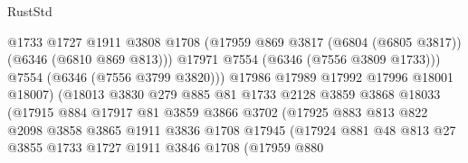\begin{lexlean}{RustStd}
\begin{coremodule}
                                    @1733
                                    @1727
                                    @1911
                                    @3808
                                    @1708
                                    (@17959
                                      @869
                                      @3817
                                      (@6804 (@6805 @3817))
                                      (@6346 (@6810 @869 @813)))
                                    @17971
                                    @7554
                                    (@6346 (@7556 @3809 @1733)))
                                  @7554
                                  (@6346 (@7556 @3799 @3820)))
                                @17986
                                @17989
                                @17992
                                @17996
                                @18001
                                @18007)
                              (@18013
                                @3830
                                @279
                                @885
                                @81
                                @1733
                                @2128
                                @3859
                                @3868
                                @18033
                                (@17915
                                  @884
                                  @17917
                                  @81
                                  @3859
                                  @3866
                                  @3702
                                  (@17925
                                    @883
                                    @813
                                    @822
                                    @2098
                                    @3858
                                    @3865
                                    @1911
                                    @3836
                                    @1708
                                    @17945
                                    (@17924
                                      @881
                                      @48
                                      @813
                                      @27
                                      @3855
                                      @1733
                                      @1727
                                      @1911
                                      @3846
                                      @1708
                                      (@17959
                                        @880

\end{coremodule}
\end{lexlean}
